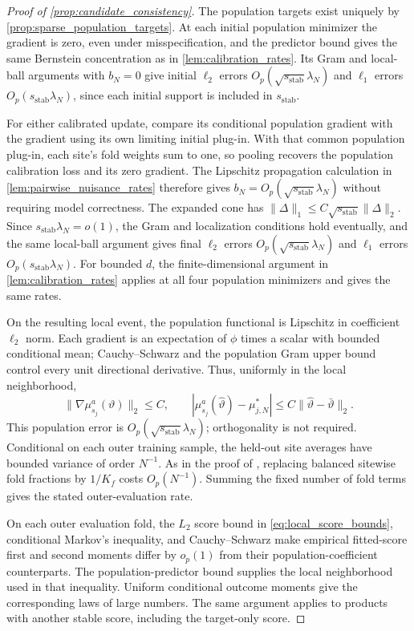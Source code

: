 \documentclass[12pt]{article}
\begin{document}
\begin{proof}[Proof of \cref{prop:candidate_consistency}]
The population targets exist uniquely by \cref{prop:sparse_population_targets}. At each initial population minimizer the gradient is zero, even under misspecification, and the predictor bound gives the same Bernstein concentration as in \cref{lem:calibration_rates}. Its Gram and local-ball arguments with $b_N=0$ give initial $\ell_2$ errors $O_p(\sqrt{s_{\mathrm{stab}}}\lambda_N)$ and $\ell_1$ errors $O_p(s_{\mathrm{stab}}\lambda_N)$, since each initial support is included in $s_{\mathrm{stab}}$.

For either calibrated update, compare its conditional population gradient with the gradient using its own limiting initial plug-in. With that common population plug-in, each site's fold weights sum to one, so pooling recovers the population calibration loss and its zero gradient. The Lipschitz propagation calculation in \cref{lem:pairwise_nuisance_rates} therefore gives $b_N=O_p(\sqrt{s_{\mathrm{stab}}}\lambda_N)$ without requiring model correctness. The expanded cone has $\|\Delta\|_1\le C\sqrt{s_{\mathrm{stab}}}\|\Delta\|_2$. Since $s_{\mathrm{stab}}\lambda_N=o(1)$, the Gram and localization conditions hold eventually, and the same local-ball argument gives final $\ell_2$ errors $O_p(\sqrt{s_{\mathrm{stab}}}\lambda_N)$ and $\ell_1$ errors $O_p(s_{\mathrm{stab}}\lambda_N)$. For bounded $d$, the finite-dimensional argument in \cref{lem:calibration_rates} applies at all four population minimizers and gives the same rates.

On the resulting local event, the population functional is Lipschitz in coefficient $\ell_2$ norm. Each gradient is an expectation of $\phi$ times a scalar with bounded conditional mean; Cauchy--Schwarz and the population Gram upper bound control every unit directional derivative. Thus, uniformly in the local neighborhood,
\[
\|\nabla\mu_{s_j}^a(\vartheta)\|_2\le C,
\qquad
|\mu_{s_j}^a(\widehat\vartheta)-\mu_{j,N}^*|
\le C\|\widehat\vartheta-\bar\vartheta\|_2.
\]
This population error is $O_p(\sqrt{s_{\mathrm{stab}}}\lambda_N)$; orthogonality is not required. Conditional on each outer training sample, the held-out site averages have bounded variance of order $N^{-1}$. As in the proof of , replacing balanced sitewise fold fractions by $1/K_f$ costs $O_p(N^{-1})$. Summing the fixed number of fold terms gives the stated outer-evaluation rate.

On each outer evaluation fold, the $L_2$ score bound in \cref{eq:local_score_bounds}, conditional Markov's inequality, and Cauchy--Schwarz make empirical fitted-score first and second moments differ by $o_p(1)$ from their population-coefficient counterparts. The population-predictor bound supplies the local neighborhood used in that inequality. Uniform conditional outcome moments give the corresponding laws of large numbers. The same argument applies to products with another stable score, including the target-only score.


\end{proof}
\end{document}

